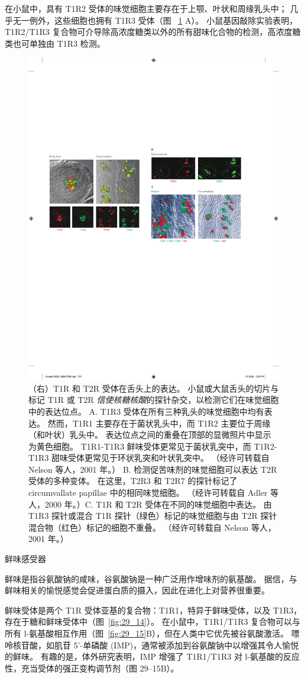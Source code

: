 在小鼠中，具有 T1R2 受体的味觉细胞主要存在于上颚、叶状和周缘乳头中；
几乎无一例外，这些细胞也拥有 T1R3 受体（图 ~\ref{fig:29_16} A）。
小鼠基因敲除实验表明，T1R2/T1R3 复合物可介导除高浓度糖类以外的所有甜味化合物的检测，高浓度糖类也可单独由 T1R3 检测。


\begin{figure}[htbp]
	\centering
	\includegraphics[width=0.5\linewidth]{chap29/fig_29_16}
	\caption{（右）T1R 和 T2R 受体在舌头上的表达。 小鼠或大鼠舌头的切片与标记 T1R 或 T2R \textit{信使核糖核酸}的探针杂交，以检测它们在味觉细胞中的表达位点。 A. T1R3 受体在所有三种乳头的味觉细胞中均有表达。 然而，T1R1 主要存在于菌状乳头中，而 T1R2 主要位于周缘（和叶状）乳头中。 表达位点之间的重叠在顶部的显微照片中显示为黄色细胞。 T1R1-T1R3 鲜味受体更常见于菌状乳突中，而 T1R2-T1R3 甜味受体更常见于环状乳突和叶状乳突中。 （经许可转载自 Nelson 等人，2001 年。） B. 检测促苦味剂的味觉细胞可以表达 T2R 受体的多种变体。 在这里，T2R3 和 T2R7 的探针标记了 circumvallate papillae 中的相同味觉细胞。 （经许可转载自 Adler 等人，2000 年。）C. T1R 和 T2R 受体在不同的味觉细胞中表达。 由 T1R3 探针或混合 T1R 探针（绿色）标记的味觉细胞与由 T2R 探针混合物（红色）标记的细胞不重叠。 （经许可转载自 Nelson 等人，2001 年。）}
	\label{fig:29_16}
\end{figure}


鲜味感受器

鲜味是指谷氨酸钠的咸味，谷氨酸钠是一种广泛用作增味剂的氨基酸。
据信，与鲜味相关的愉悦感觉会促进蛋白质的摄入，因此在进化上对营养很重要。


鲜味受体是两个 T1R 受体亚基的复合物：T1R1，特异于鲜味受体，以及 T1R3，存在于糖和鲜味受体中（图~\ref{fig:29_14}）。
在小鼠中，T1R1/T1R3 复合物可以与所有 l-氨基酸相互作用（图~\ref{fig:29_15}B），但在人类中它优先被谷氨酸激活。
嘌呤核苷酸，如肌苷 5'-单磷酸 (IMP)，通常被添加到谷氨酸钠中以增强其令人愉悦的鲜味。
有趣的是，体外研究表明，IMP 增强了 T1R1/T1R3 对 l-氨基酸的反应性，充当受体的强正变构调节剂（图 29–15B）。


